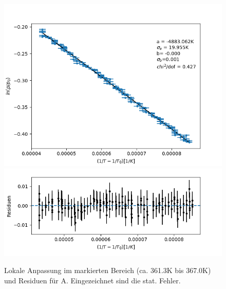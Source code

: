 \documentclass[12pt,a4paper]{article}
\begin{document}
\begin{figure}
\centering
\includegraphics[width=0.8\linewidth]{Bilder/lokaler_fit_2A.png}
\includegraphics[width=0.8\linewidth]{Bilder/lokale_Residuen_2A}
\caption[Lokale Anpassung]{Lokale Anpassung im markierten Bereich (ca. 361.3K bis 367.0K) und Residuen für A. Eingezeichnet sind die stat. Fehler.}
\label{fig:fit_2A}
\end{figure}
\end{document}
